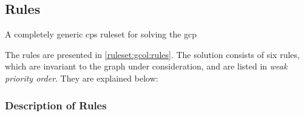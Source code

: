 \subsection{\label{sec:gcol:rules}Rules}

\begin{cprulesetfloat}
\begin{cpruleset}

    
    
    
    
    
\end{cpruleset}
\caption[\gls{cps} rules for the ]{\label{ruleset:gcol:rules}A completely generic \gls{cps} \gls{ruleset} for solving the \gls{gcp}}
\end{cprulesetfloat}

The rules are presented in \cref{ruleset:gcol:rules}.  The solution consists of six rules, which are invariant to the graph under consideration, and are listed in \emph{weak priority order}.  They are explained below:

\subsubsection{Description of Rules}


